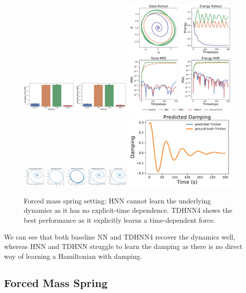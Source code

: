 \documentclass[twoside]{article}
\begin{document}
\begin{figure}[h!]
\centering
\includegraphics[width=0.49\textwidth]{figures/damped_1_errors.pdf}
\includegraphics[width=0.49\textwidth]{figures/damped_1_pred.pdf}
\includegraphics[width=0.49\textwidth]{figures/damped_rollout.pdf}
\includegraphics[width=0.49\textwidth]{figures/TDHNN4_damped_1.pdf}
\caption{Forced mass spring setting: HNN cannot learn the underlying dynamics as it has no explicit-time dependence. TDHNN4 shows the best performance as it explicitly learns a time-dependent force.}
\label{damped}
\end{figure}

We can see that both baseline NN and TDHNN4 recover the dynamics well, whereas HNN and TDHNN struggle to learn the damping as there is no direct way of learning a Hamiltonian with damping.

\subsection{Forced Mass Spring}
\end{document}
